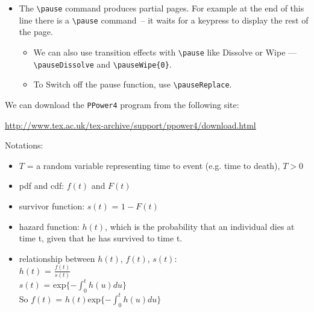 \documentclass[landscape]{foils}
\begin{document}
\begin{itemize}
\item The \verb|\pause| command produces partial pages.  For example
  at the end of this line there is a \verb|\pause| command\pause \,
  -- it waits for a keypress to display the rest of the page.
  \pauseDissolve  %
  \begin{itemize}
  \item We can also use transition effects with \verb|\pause| like Dissolve
    or Wipe --- \verb+\pauseDissolve+ and \verb+\pauseWipe{0}+.
  \item To Switch off the pause function, use \verb+\pauseReplace+.
  \end{itemize}
\end{itemize}

We can download the {\tt PPower4} program from the following site:

\href{http://www.tex.ac.uk/tex-archive/support/ppower4/download.html}{http://www.tex.ac.uk/tex-archive/support/ppower4/download.html}


\LogoOff
\hypersetup{pdfpagetransition=Replace}
  Notations: \pause
  \begin{itemize}
    \item{ $T$ = a random variable representing time to event
           (e.g. time to death), $T > 0$ } \pauseDissolve
    \item{ pdf and cdf: $f(t)$ and $F(t)$ } \pause
    \item{ survivor function: $s(t)$ = $1-F(t)$ } \pauseVBlinds
    \item{ hazard function: $h(t)$, 
           which is the probability that an individual dies at
           time t, given that he has survived to time t.} \pause
    \item{ relationship between $h(t)$, $f(t)$, $s(t)$:\\
           $h(t)$ = $\frac{f(t)}{s(t)}$ \\
           $s(t)$ = exp$\{- \int^t_0 h(u) du \}$ \\
           So $f(t)$ = $h(t)$exp$\{- \int^t_0 h(u) du \}$
           } 
  \end{itemize}
\end{document}
